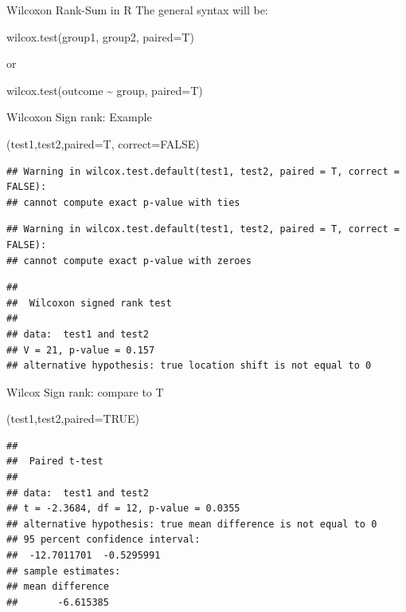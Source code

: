 \documentclass[
  ignorenonframetext,
  aspectratio=169]{beamer}
\newenvironment{Shaded}{\begin{snugshade}}{\end{snugshade}}
\newcommand{\AttributeTok}[1]{\textcolor[rgb]{0.13,0.29,0.53}{#1}}
\newcommand{\ConstantTok}[1]{\textcolor[rgb]{0.56,0.35,0.01}{#1}}
\newcommand{\FunctionTok}[1]{\textcolor[rgb]{0.13,0.29,0.53}{\textbf{#1}}}
\newcommand{\NormalTok}[1]{#1}
\renewcommand{\textbf}{\structure}
\begin{document}
\begin{frame}{Wilcoxon Rank-Sum in R}
\protect\hypertarget{wilcoxon-rank-sum-in-r-1}{}
The general syntax will be:

wilcox.test(group1, group2, paired=T)

or

wilcox.test(outcome \textasciitilde{} group, paired=T)
\end{frame}

\begin{frame}[fragile]{Wilcoxon Sign rank: Example}
\protect\hypertarget{wilcoxon-sign-rank-example-2}{}
\begin{Shaded}
\begin{Highlighting}[]
\FunctionTok{wilcox.test}\NormalTok{(test1,test2,}\AttributeTok{paired=}\NormalTok{T, }\AttributeTok{correct=}\ConstantTok{FALSE}\NormalTok{)}
\end{Highlighting}
\end{Shaded}

\begin{verbatim}
## Warning in wilcox.test.default(test1, test2, paired = T, correct = FALSE):
## cannot compute exact p-value with ties
\end{verbatim}

\begin{verbatim}
## Warning in wilcox.test.default(test1, test2, paired = T, correct = FALSE):
## cannot compute exact p-value with zeroes
\end{verbatim}

\begin{verbatim}
## 
##  Wilcoxon signed rank test
## 
## data:  test1 and test2
## V = 21, p-value = 0.157
## alternative hypothesis: true location shift is not equal to 0
\end{verbatim}
\end{frame}

\begin{frame}[fragile]{Wilcox Sign rank: compare to T}
\protect\hypertarget{wilcox-sign-rank-compare-to-t}{}
\begin{Shaded}
\begin{Highlighting}[]
\FunctionTok{t.test}\NormalTok{(test1,test2,}\AttributeTok{paired=}\ConstantTok{TRUE}\NormalTok{)}
\end{Highlighting}
\end{Shaded}

\begin{verbatim}
## 
##  Paired t-test
## 
## data:  test1 and test2
## t = -2.3684, df = 12, p-value = 0.0355
## alternative hypothesis: true mean difference is not equal to 0
## 95 percent confidence interval:
##  -12.7011701  -0.5295991
## sample estimates:
## mean difference 
##       -6.615385
\end{verbatim}
\end{frame}
\end{document}
